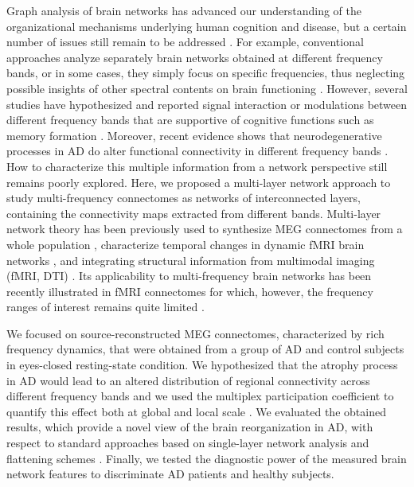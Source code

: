 Graph analysis of brain networks has advanced our understanding of the organizational mechanisms underlying human cognition and disease, but a certain number of issues still remain to be addressed \citep{de_vico_fallani_graph_2014,bullmore_complex_2009}.
For example,  conventional approaches analyze separately brain networks obtained at different frequency bands, or in some cases, they simply focus on specific frequencies, thus neglecting possible insights of other spectral contents on brain functioning \citep{de_vico_fallani_graph_2014}.
However, several studies have hypothesized and reported signal interaction or modulations between different frequency bands that are supportive of cognitive functions such as memory formation \citep{canolty_functional_2010, jirsa_cross-frequency_2013,brookes_multi-layer_2016-1}.
Moreover, recent evidence shows that neurodegenerative processes in AD do alter functional connectivity in different frequency bands \citep{fraga_characterizing_2013,engels_declining_2015, blinowska_functional_2016}.
How to characterize this multiple information from a network perspective still remains poorly explored.
Here, we proposed a multi-layer network approach to study multi-frequency connectomes as networks of interconnected layers, containing the connectivity maps extracted from different bands.
Multi-layer network theory has been previously used to synthesize MEG connectomes from a whole population \citep{ghanbari_functionally_2014}, characterize temporal changes in dynamic fMRI brain networks \citep{bassett_dynamic_2011}, and integrating structural information from multimodal imaging (fMRI, DTI) \citep{simas_algebraic_2015, battiston_multilayer_2016}.
Its applicability to multi-frequency brain networks has been recently illustrated in fMRI connectomes for which, however, the frequency ranges of interest remains quite limited \citep{de_domenico_mapping_2016}.

We focused on source-reconstructed MEG connectomes, characterized by rich frequency dynamics, that were obtained from a group of AD and control subjects in eyes-closed resting-state condition.
We hypothesized that the atrophy process in AD would lead to an altered distribution of regional connectivity across different frequency bands and we used the multiplex participation coefficient to quantify this effect both at global and local scale \citep{battiston_structural_2014}.
We evaluated the obtained results, which provide a novel view of the brain reorganization in AD, with respect to standard approaches based on single-layer network analysis and flattening schemes \citep{de_domenico_mathematical_2013}.
Finally, we tested the diagnostic power of the measured brain network features to discriminate AD patients and healthy subjects.
